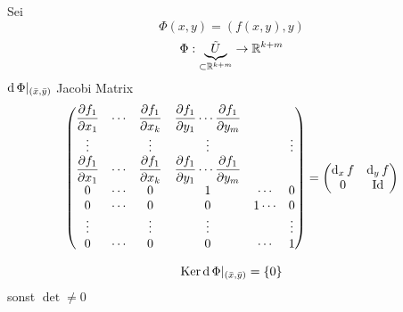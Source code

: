 \begin{Bew}
  Sei
  \[\Phi(x,y)=(f(x,y),y)\]
  \[\Phi:\underbrace{\tilde U}_{\subset\mathbb{R}^{k+m}}\rightarrow\mathbb{R}^{k+m}\]
  $\operatorname{d}\Phi|_{(\bar x, \bar y)}$ Jacobi Matrix
  \[ \begin{pmatrix}
    \dfrac{\partial f_1}{\partial x_1}&\cdots&\dfrac{\partial f_1}{\partial x_k}&\dfrac{\partial f_1}{\partial y_1}\cdots\dfrac{\partial f_1}{\partial y_m}\\
    \vdots & & \vdots & \vdots & & \vdots \\
    \dfrac{\partial f_1}{\partial x_1}&\cdots&\dfrac{\partial f_1}{\partial x_k}&\dfrac{\partial f_1}{\partial y_1}\cdots\dfrac{\partial f_1}{\partial y_m}\\
    0 & \cdots & 0 & 1 & \cdots & 0\\
    0 & \cdots & 0 & 0 & 1 \cdots & 0\\
    \vdots & & \vdots &\vdots & & \vdots\\
    0 & \cdots & 0 & 0 & \cdots & 1
  \end{pmatrix} = \begin{pmatrix}
    \operatorname{d}_x f & \operatorname{d}_y f\\
    0 & \operatorname{Id}
  \end{pmatrix}\]
\end{Bew}
\begin{Ueb}
  \[\operatorname{Ker} \operatorname{d} \Phi|_{(\bar x,\bar y)}=\left\{ 0 \right\}\]
  sonst $\det \neq 0$
\end{Ueb}
